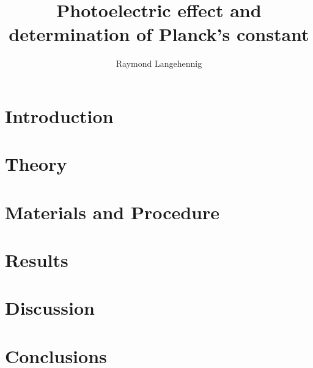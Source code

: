 \documentclass{article}
\title{Photoelectric effect and determination of Planck's constant}
\author{Raymond Langehennig}
\begin{document}
\maketitle

\section{Introduction}


\section{Theory}

\section{Materials and Procedure}

\section{Results}

\section{Discussion}

\section{Conclusions}
\end{document}
